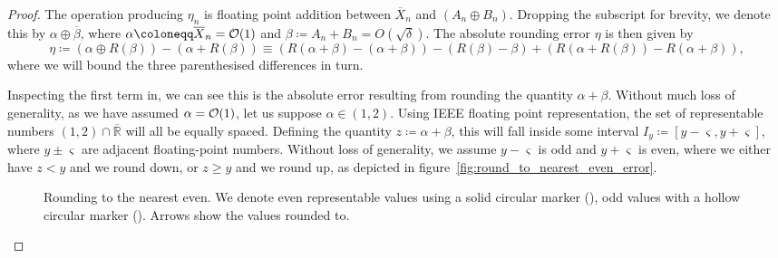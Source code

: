 \documentclass[manuscript,review]{acmart}
\begin{document}
\begin{proof}
The operation producing $ \eta_n $ is floating point addition between $ \overline{X}_n $ and $ (A_n \oplus B_n) $.  Dropping the subscript for brevity, we denote this by $ \alpha \oplus \overline{\beta} $, where $ \alpha \coloneqq  \overline{X}_n = \order{1} $ and   $ \beta \coloneqq A_n + B_n = O(\sqrt{\delta}) $. The absolute rounding error $ \eta $ is then given by 
\begin{equation*}
\label{eqt:absolute_rounding_errors_decomposition_for_floating_point_addition}
\eta \coloneqq (\alpha \oplus R(\beta)) - (\alpha + R(\beta)) \equiv (R(\alpha + \beta) - (\alpha + \beta)) - (R(\beta) - \beta) +  (R(\alpha + R(\beta)) - R(\alpha + \beta)), 
\end{equation*}
where we will bound the three parenthesised differences in turn. 

Inspecting the first term in, we can see this is the absolute error resulting from rounding the quantity $ \alpha + \beta $. Without much loss of generality, as we have assumed $ \alpha = \order{1} $, let us suppose $ \alpha \in (1, 2) $. Using IEEE floating point representation, the set of representable numbers $ (1, 2) \cap \overline{\mathbb{R}} $ will all be equally spaced. Defining the quantity $ z \coloneqq \alpha + \beta $, this will fall inside some interval $I_y \coloneqq [y-\varsigma, y + \varsigma] $, where $ y\pm\varsigma $ are adjacent floating-point numbers. Without loss of generality, we assume $ y - \varsigma $ is odd and $ y + \varsigma $ is even, where we either have $ z < y $ and we round down, or $ z \geq y $ and we round up, as depicted in figure~\ref{fig:round_to_nearest_even_error}.

\begin{figure}[htb]
\centering
{}
\caption{Rounding to the nearest even. We denote even representable values using a solid circular marker (\raisebox{-0.25em}{\Huge$ \bullet $}), odd values with a hollow circular marker (\raisebox{0.05em}{$ \bigcirc $}). Arrows show the values rounded to.}
\label{fig:round_to_nearest_even}
\end{figure}


\end{proof}
\end{document}
